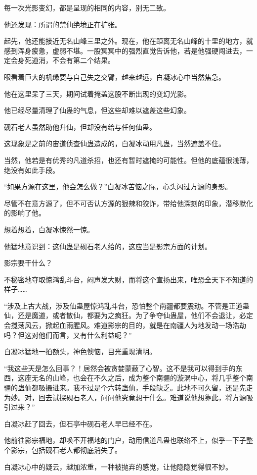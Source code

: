 \begin{this_body}
每一次光影变幻，都是呈现的相同的内容，别无二致。

他还发现：所谓的禁仙绝境正在扩张。

起先，他还能接近无名山峰三里之外。现在，他在距离无名山峰的十里的地方，就感到浑身疲惫，虚弱不堪。一股冥冥中的强烈直觉告诉他，若是他强硬闯进去，一定会身死道消，不会有第二个结果。

眼看着巨大的机缘要与自己失之交臂，越来越远，白凝冰心中当然焦急。

他在这里呆了三天，期间试着掩盖这股不断出现的变幻光影。

他已经尽量清理了仙蛊的气息，但这些却难以遮盖这些幻象。

砚石老人虽然助他升仙，但却没有给与任何仙蛊。

这现象是之前的宙道侦查仙蛊造成的，白凝冰动用凡蛊，当然遮盖不住。

当然，他若是有优秀的凡道杀招，也还有暂时遮掩的可能性。但他的底蕴很浅薄，绝没有如此手段。

“如果方源在这里，他会怎么做？”白凝冰苦恼之际，心头闪过方源的身影。

尽管不在意方源了，但不可否认方源的狠辣和狡诈，带给他深刻的印象，潜移默化的影响了他。

想着想着，白凝冰悚然一惊。

他猛地意识到：这仙蛊是砚石老人给的，这应当是影宗方面的计划。

影宗要干什么？

不秘密地夺取惊鸿乱斗台，闷声发大财，而将这个宣扬出来，唯恐全天下不知道的样子……

“涉及上古大战，涉及仙蛊屋惊鸿乱斗台，恐怕整个南疆都要震动。不管是正道蛊仙，还是魔道，或者散仙，都要为之疯狂。为了争夺仙蛊屋，他们不会退让，必定会搅荡风云，掀起血雨腥风。难道影宗的目的，就是在南疆人为地发动一场浩劫吗？但这对他们而言，又有什么利益呢？”

白凝冰猛地一拍额头，神色懊恼，目光重现清明。

“我这些天是怎么回事？！居然会被贪婪蒙蔽了心智。这不是我可以得到手的东西，这座无名的山峰，也会在不久之后，成为整个南疆的漩涡中心，将几乎整个南疆的蛊仙都吸摄进来。我不过是个六转蛊仙，手段缺乏。此地不可久留，还是先走为妙。对，回去试探砚石老人，问问他究竟想干什么。难道说他想靠此，将方源吸引过来？”

白凝冰赶了回去，但石亭中砚石老人早已经不在。

他前往影宗福地，却唤不开福地的门户，动用信道凡蛊也联络不上，似乎一下子整个影宗，包括砚石老人都彻底消失了。

白凝冰心中的疑云，越加浓重，一种被抛弃的感觉，让他隐隐觉得很不妙。


\end{this_body}
